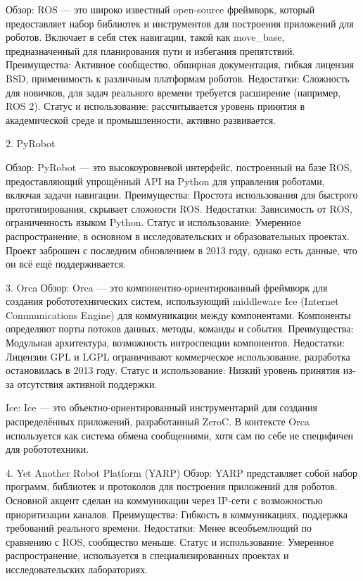 Обзор: ROS — это широко известный open-source фреймворк, который
предоставляет набор библиотек и инструментов для построения приложений для
роботов. Включает в себя стек навигации, такой как move\_base,
предназначенный для планирования пути и избегания препятствий. Преимущества:
Активное сообщество, обширная документация, гибкая лицензия BSD,
применимость к различным платформам роботов. Недостатки: Сложность для
новичков, для задач реального времени требуется расширение (например, ROS
2). Статус и использование: рассчитывается уровень принятия в академической среде и
промышленности, активно развивается.

2. PyRobot

Обзор: PyRobot — это высокоуровневой интерфейс, построенный на базе ROS,
предоставляющий упрощённый API на Python для управления роботами, включая
задачи навигации. Преимущества: Простота использования для быстрого
прототипирования, скрывает сложности ROS. Недостатки: Зависимость от ROS,
ограниченность языком Python. Статус и использование: Умеренное
распространение, в основном в исследовательских и образовательных проектах.
Проект заброшен с последним обновлением в 2013 году, однако есть данные,
что он всё ещё поддерживается.

3. Orca
Обзор: Orca — это компонентно-ориентированный фреймворк для создания
робототехнических систем, использующий middleware Ice (Internet
Communications Engine) для коммуникации между компонентами. Компоненты
определяют порты потоков данных, методы, команды и события. Преимущества:
Модульная архитектура, возможность интроспекции компонентов. Недостатки:
Лицензии GPL и LGPL ограничивают коммерческое использование, разработка
остановилась в 2013 году. Статус и использование: Низкий уровень принятия
из-за отсутствия активной поддержки.

Ice: Ice — это объектно-ориентированный инструментарий для создания
распределённых приложений, разработанный ZeroC. В контексте Orca
используется как система обмена сообщениями, хотя сам по себе не специфичен
для робототехники. 

4. Yet Another Robot Platform (YARP)
Обзор: YARP представляет собой набор программ, библиотек и протоколов для
построения приложений для роботов. Основной акцент сделан на коммуникации
через IP-сети с возможностью приоритизации каналов. Преимущества: Гибкость в
коммуникациях, поддержка требований реального времени. Недостатки: Менее
всеобъемлющий по сравнению с ROS, сообщество меньше. Статус и использование:
Умеренное распространение, используется в специализированных проектах и
исследовательских лабораториях.

